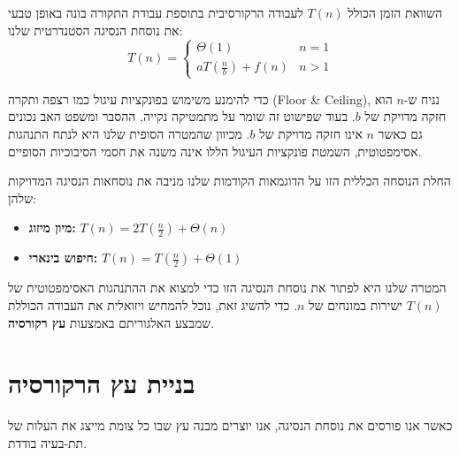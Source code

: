 \documentclass[11pt, a4paper]{article}
\begin{document}
השוואת הזמן הכולל $T(n)$ לעבודה הרקורסיבית בתוספת עבודת התקורה בונה באופן טבעי את נוסחת הנסיגה הסטנדרטית שלנו:
\[T(n)=\begin{cases}
    \Theta(1)  & n = 1 \\
   aT(\frac{n}{b})+f(n) & n>1
\end{cases}
\]

כדי להימנע משימוש בפונקציות עיגול כמו רצפה ותקרה (\textenglish{Floor \& Ceiling}), נניח ש-$n$ הוא חזקה מדויקת של $b$. בעוד שפישוט זה שומר על מתמטיקה נקייה, ההסבר ומשפט האב נכונים גם כאשר $n$ אינו חזקה מדויקת של $b$. מכיוון שהמטרה הסופית שלנו היא לנתח התנהגות אסימפטוטית, השמטת פונקציות העיגול הללו אינה משנה את חסמי הסיבוכיות הסופיים.

החלת הנוסחה הכללית הזו על הדוגמאות הקודמות שלנו מניבה את נוסחאות הנסיגה המדויקות שלהן:
\begin{itemize}
    \item \textbf{מיון מיזוג:} $T(n) = 2T\left(\frac{n}{2}\right) + \Theta(n)$
    \item \textbf{חיפוש בינארי:} $T(n) = T\left(\frac{n}{2}\right) + \Theta(1)$
\end{itemize}

המטרה שלנו היא לפתור את נוסחת הנסיגה הזו כדי למצוא את ההתנהגות האסימפטוטית של $T(n)$ ישירות במונחים של $n$. כדי להשיג זאת, נוכל להמחיש ויזואלית את העבודה הכוללת שמבצע האלגוריתם באמצעות \textbf{עץ רקורסיה}.
\newpage
\section*{בניית עץ הרקורסיה}
כאשר אנו פורסים את נוסחת הנסיגה, אנו יוצרים מבנה עץ שבו כל צומת מייצג את העלות של תת-בעיה בודדת.
\end{document}
